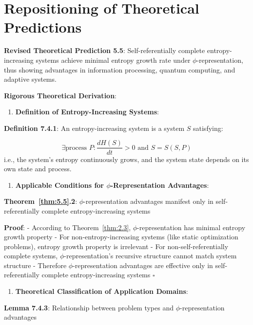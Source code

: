 \section{Repositioning of Theoretical Predictions}
\label{sec:ch07_applications:repositioning-of-theoretical-predictions}

\textbf{Revised Theoretical Prediction 5.5}: Self-referentially complete entropy-increasing systems achieve minimal entropy growth rate under $\phi$-representation, thus showing advantages in information processing, quantum computing, and adaptive systems.

\textbf{Rigorous Theoretical Derivation}:

\begin{enumerate}
\item \textbf{Definition of Entropy-Increasing Systems}:
\end{enumerate}
   \textbf{Definition 7.4.1}: An entropy-increasing system is a system $S$ satisfying:
\label{thm:5.5}
   
\begin{equation}
\exists \text{process } P: \frac{dH(S)}{dt} > 0 \text{ and } S = S(S, P)
\end{equation}
   i.e., the system's entropy continuously grows, and the system state depends on its own state and process.

\begin{enumerate}
\item \textbf{Applicable Conditions for $\phi$-Representation Advantages}:
\end{enumerate}
   \textbf{Theorem~\ref{thm:5.5}.2}: $\phi$-representation advantages manifest only in self-referentially complete entropy-increasing systems
\label{thm:5.5}
   
   \textbf{Proof}:
   - According to Theorem~\ref{thm:2.3}, $\phi$-representation has minimal entropy growth property
   - For non-entropy-increasing systems (like static optimization problems), entropy growth property is irrelevant
   - For non-self-referentially complete systems, $\phi$-representation's recursive structure cannot match system structure
   - Therefore $\phi$-representation advantages are effective only in self-referentially complete entropy-increasing systems $\square$

\begin{enumerate}
\item \textbf{Theoretical Classification of Application Domains}:
\end{enumerate}
   \textbf{Lemma 7.4.3}: Relationship between problem types and $\phi$-representation advantages
\label{thm:5.5}
   
